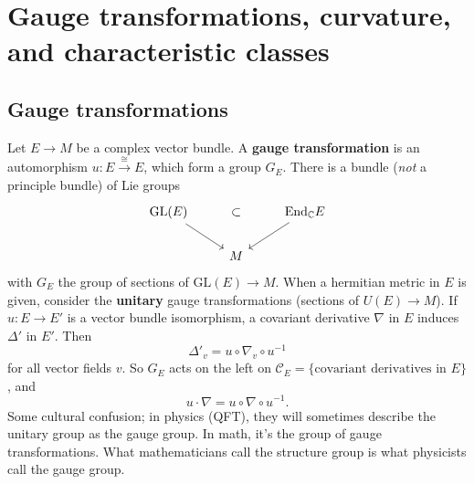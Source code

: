 \section{Gauge transformations, curvature, and characteristic classes} 
\subsection{Gauge transformations}
Let $E \to M$ be a complex vector bundle. A \textbf{gauge transformation} is an automorphism $ u \colon E \xrightarrow{\cong } E $, which form a group $G_E$. There is a bundle (\emph{not} a principle bundle) of Lie groups \[
\begin{tikzcd}
\mathrm{GL}(E) \arrow[rr, phantom] \arrow[rd] & \subset & \mathrm{End}_{\C}E \arrow[ld] \\
                                              & M       &                              
\end{tikzcd}
\] with $G_E$ the group of sections of $\mathrm{GL}(E) \to M$. When a hermitian metric in $E$ is given, consider the \textbf{unitary} gauge transformations (sections of $U(E) \to M$). If $u \colon E \to E'$ is a vector bundle isomorphism, a covariant derivative $\nabla$ in $E$ induces $\Delta '$ in $E'$. Then \[
\Delta '_v = u \circ \nabla_v \circ  u^{-1}
\] for all vector fields $v$. So $G_E$ acts on the left on $\mathcal{C} _E = \{\text{covariant derivatives in } E\} $, and \[
u \cdot \nabla = u \circ \nabla \circ u^{-1}.
\] Some cultural confusion; in physics (QFT), they will sometimes describe the unitary group as the gauge group. In math, it's the group of gauge transformations. What mathematicians call the structure group is what physicists call the gauge group.

